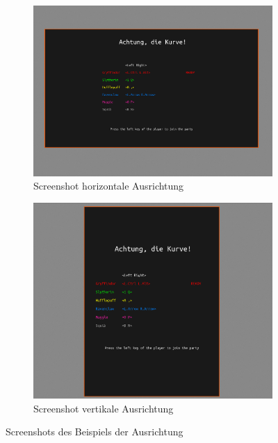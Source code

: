 \documentclass[doktyp=studarbeit]{TUBAFarbeiten}
\begin{document}
\begin{figure}[!htb]
    \centering
    \begin{subfigure}[b]{0.517\textwidth}
        \centering
        \includegraphics[width=1\linewidth]{aspect-ratio-1.png}
        \caption{Screenshot horizontale Ausrichtung}
    \end{subfigure}
    \begin{subfigure}[b]{0.45\textwidth}
        \centering
        \includegraphics[width=1\linewidth]{aspect-ratio-2.png}
        \caption{Screenshot vertikale Ausrichtung}
    \end{subfigure}
    \caption{Screenshots des Beispiels der Ausrichtung}
	\label{fig:display-aspect-ratio}
\end{figure}
\end{document}
